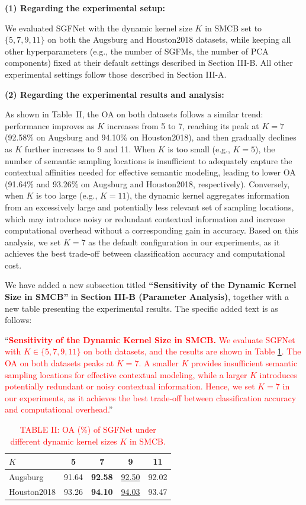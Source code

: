 \textbf{(1) Regarding the experimental setup:}

We evaluated SGFNet with the dynamic kernel size $K$ in SMCB set to $\{5, 7, 9, 11\}$ on both the Augsburg and Houston2018 datasets, while keeping all other hyperparameters (e.g., the number of SGFMs, the number of PCA components) fixed at their default settings described in Section III-B. All other experimental settings follow those described in Section III-A.

\textbf{(2) Regarding the experimental results and analysis:}

As shown in Table~II, the OA on both datasets follows a similar trend: performance improves as $K$ increases from 5 to 7, reaching its peak at $K=7$ (92.58\% on Augsburg and 94.10\% on Houston2018), and then gradually declines as $K$ further increases to 9 and 11. When $K$ is too small (e.g., $K=5$), the number of semantic sampling locations is insufficient to adequately capture the contextual affinities needed for effective semantic modeling, leading to lower OA (91.64\% and 93.26\% on Augsburg and Houston2018, respectively). Conversely, when $K$ is too large (e.g., $K=11$), the dynamic kernel aggregates information from an excessively large and potentially less relevant set of sampling locations, which may introduce noisy or redundant contextual information and increase computational overhead without a corresponding gain in accuracy. Based on this analysis, we set $K=7$ as the default configuration in our experiments, as it achieves the best trade-off between classification accuracy and computational cost.

We have added a new subsection titled \textbf{``Sensitivity of the Dynamic Kernel Size in SMCB''} in \textbf{Section III-B (Parameter Analysis)}, together with a new table presenting the experimental results. The specific added text is as follows:

``\textbf{\textcolor{red}{Sensitivity of the Dynamic Kernel Size in SMCB.}} \textcolor{red}{We evaluate SGFNet with $K \in \{5, 7, 9, 11\}$ on both datasets, and the results are shown in Table \ref{table_kernel}. The OA on both datasets peaks at $K=7$. A smaller $K$ provides insufficient semantic sampling locations for effective contextual modeling, while a larger $K$ introduces potentially redundant or noisy contextual information. Hence, we set $K=7$ in our experiments, as it achieves the best trade-off between classification accuracy and computational overhead.}''

\begin{table}[h]
  \centering
  \footnotesize
  \caption*{\textcolor{red}{\footnotesize TABLE II: OA (\%) of SGFNet under different dynamic kernel sizes $K$ in SMCB.}}
  \begin{tabular}{lcccc}
  \toprule
  $K$ & 5 & 7 & 9 & 11 \\
  \midrule
  Augsburg    & 91.64 & \textbf{92.58} & \underline{92.50} & 92.02 \\
  Houston2018 & 93.26 & \textbf{94.10} & \underline{94.03} & 93.47 \\
  \bottomrule
  \end{tabular}
  \label{table_kernel}
\end{table}

